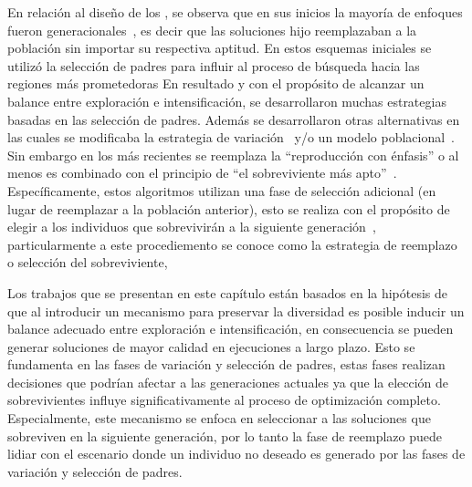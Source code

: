 En relación al diseño de los \EAS{}, se observa que en sus inicios la mayoría de enfoques fueron generacionales~\cite{de2006evolutionary}, es decir que las soluciones hijo reemplazaban a la población sin importar su respectiva aptitud.
%
En estos esquemas iniciales se utilizó la selección de padres para influir al proceso de búsqueda hacia las regiones más prometedoras
%
En resultado y con el propósito de alcanzar un balance entre exploración e intensificación, se desarrollaron muchas estrategias basadas en las selección de padres.
%
Además se desarrollaron otras alternativas en las cuales se modificaba la estrategia de variación~\cite{Joel:herrera2003fuzzy} y/o un modelo poblacional~\cite{alba2005parallel}.
%
Sin embargo en los \EAS{} más recientes se reemplaza la ``reproducción con énfasis'' o al menos es combinado con el principio de ``el sobreviviente más apto''~\cite{Joel:CHC}.
%
Específicamente, estos algoritmos utilizan una fase de selección adicional (en lugar de reemplazar a la población anterior), esto se realiza con el propósito de elegir a los individuos que sobrevivirán a la siguiente generación~\cite{eiben2003introduction}, particularmente a este procediemento se conoce como la estrategia de reemplazo o selección del sobreviviente, 
%


Los trabajos que se presentan en este capítulo están basados en la hipótesis de que al introducir un mecanismo para preservar la diversidad es posible inducir un balance adecuado entre exploración e intensificación, en consecuencia se pueden generar soluciones de mayor calidad en ejecuciones a largo plazo.
%
Esto se fundamenta en las fases de variación y selección de padres, estas fases realizan decisiones que podrían afectar a las generaciones actuales ya que la elección de sobrevivientes influye significativamente al proceso de optimización completo.
%
Especialmente, este mecanismo se enfoca en seleccionar a las soluciones que sobreviven en la siguiente generación, por lo tanto la fase de reemplazo puede lidiar con el escenario donde un individuo no deseado es generado por las fases de variación y selección de padres.

